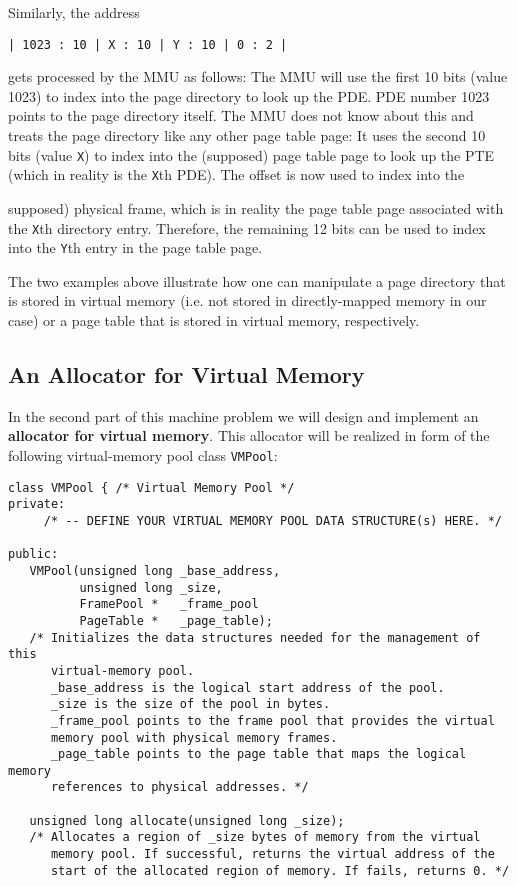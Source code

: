 \documentclass[letterpaper,11pt]{article}
\begin{document}
Similarly, the address 
\begin{center}
{\tt | 1023 : 10 | X : 10 | Y : 10 | 0 : 2 |}
\end{center}
gets processed by the MMU as follows: The MMU will use the first 10
bits (value 1023) to index into the page directory to look up the
PDE. PDE number 1023 points to the page directory itself. The MMU does
not know about this and treats the page directory like any other page
table page: It uses the second 10 bits (value {\tt X}) to index into
the (supposed) page table page to look up the PTE (which in reality is
the {\tt X}th PDE). The offset is now used to index into the
{supposed) physical frame, which is in reality the page table page
  associated with the {\tt X}th directory entry. Therefore, the
  remaining 12 bits can be used to index into the {\tt Y}th entry in
  the page table page.

The two examples above illustrate how one can manipulate a page
directory that is stored in virtual memory (i.e. not stored in
directly-mapped memory in our case) or a page table that is stored in
virtual memory, respectively.

\subsection*{An Allocator for Virtual Memory}

In the second part of this machine problem we will design and
implement an {\bf allocator for virtual memory}. This allocator will
be realized in form of the following virtual-memory pool class {\tt VMPool}:
\begin{verbatim}
class VMPool { /* Virtual Memory Pool */
private:
     /* -- DEFINE YOUR VIRTUAL MEMORY POOL DATA STRUCTURE(s) HERE. */

public:
   VMPool(unsigned long _base_address,
          unsigned long _size,
          FramePool *   _frame_pool
          PageTable *   _page_table);
   /* Initializes the data structures needed for the management of this
      virtual-memory pool. 
      _base_address is the logical start address of the pool. 
      _size is the size of the pool in bytes.
      _frame_pool points to the frame pool that provides the virtual 
      memory pool with physical memory frames.
      _page_table points to the page table that maps the logical memory
      references to physical addresses. */

   unsigned long allocate(unsigned long _size);
   /* Allocates a region of _size bytes of memory from the virtual 
      memory pool. If successful, returns the virtual address of the
      start of the allocated region of memory. If fails, returns 0. */


\end{verbatim}}
\end{document}

